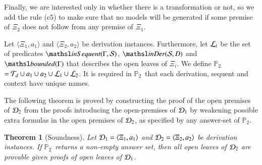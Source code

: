 \documentclass{new_tlp}
\newcommand{\inSequent}[2]{\ensuremath{\tsl{inSequent}(\ensuremath{#1},\ensuremath{#2})}}
\newcommand{\inDer}[2]{\ensuremath{\tsl{inDer}(\ensuremath{#1},\ensuremath{#2})}}
\newcommand{\provIf}[2]{\ensuremath{\tsl{proveIf}(\ensuremath{#1},\ensuremath{#2})}}
\newcommand{\notProvIf}[2]{\ensuremath{\tsl{notProveIf}(\ensuremath{#1},\ensuremath{#2})}}
\newcommand{\bounded}[1]{\ensuremath{{\tsl{bounded}(\ensuremath{#1})}}}
\newcommand\LPprov{\ensuremath{\mathbb{P}_2}}
\newtheorem{theorem}{Theorem}
\begin{document}
Finally, we are interested only in whether there is a transformation or not, so we add the
rule (c5) to make sure that no models will be generated if some premise of $\Xi_2$ does not follow
from any premise of $\Xi_1$.

Let $\langle \Xi_1, a_1 \rangle$ and $\langle \Xi_2, a_2 \rangle$ be
derivation instances. Furthermore, let ${\mathcal L}_i$ be the set of predicates
$\inSequent{\Gamma}{\Sscr}$, $\inDer{\Sscr}{D}$ and $\bounded{\Gamma}$
that describes the open leaves of $\Xi_i$. We define \LPprov\ $=
\Tscr_d \cup a_1 \cup a_2 \cup \Lscr_1 \cup \Lscr_2$. It is required in \LPprov\
that each derivation, sequent and context have unique names.

The following theorem is proved by constructing the proof of the open premises of $\Dscr_2$ from the proofs
introducing the open-premises of 
$\Dscr_1$ by weakening possible extra formulas in the open premises of $\Dscr_2$, as specified
by any answer-set of \LPprov.

\begin{theorem}[Soundness]
Let $\Dscr_1 = \langle \Xi_1, a_1 \rangle$ and $\Dscr_2 = \langle \Xi_2, a_2 \rangle$ be derivation
instances.
If \LPprov\ returns a non-empty answer set, then all open leaves of $\Dscr_2$
are provable given proofs of open leaves of $\Dscr_1$.
\end{theorem}

% 
\end{document}
